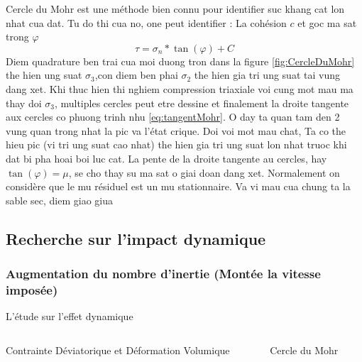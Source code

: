 \documentclass[a4paper,12pt]{report}
\begin{document}
Cercle du Mohr est une méthode bien connu pour identifier suc khang cat lon nhat cua dat. Tu do thi cua no, one peut identifier : La cohésion $c$ et goc ma sat trong $\varphi$
\begin{equation}
    \tau = \sigma_n * \tan(\varphi) + C
    \label{eq:tangentMohr}
\end{equation}
Diem quadrature ben trai cua moi duong tron dans la figure \ref{fig:CercleDuMohr} the hien ung suat $\sigma_3$,con diem ben phai $\sigma_2$ the hien gia tri ung suat tai vung dang xet.
Khi thuc hien thi nghiem compression triaxiale voi cung mot mau ma thay doi $\sigma_3$, multiples cercles peut etre dessine et finalement la droite tangente aux cercles co phuong trinh nhu \ref{eq:tangentMohr}.
O day ta quan tam den 2 vung quan trong nhat la pic va l'état crique.
Doi voi mot mau chat, Ta co the hieu pic (vi tri ung suat cao nhat) the hien gia tri ung suat lon nhat truoc khi dat bi pha hoai boi luc cat. 
La pente de la droite tangente au cercles, hay $\tan(\varphi) = \mu$, se cho thay su ma sat o giai doan dang xet. 
Normalement on considère que le mu résiduel est un mu stationnaire. 
Va vi mau cua chung ta la sable sec, diem giao giua 

\subsection{Recherche sur l'impact dynamique}

\subsubsection{Augmentation du nombre d'inertie (Montée la vitesse imposée)}


                                    \begin{frame}{L'étude sur l'effet dynamique}
    \begin{columns}
        \begin{column}{0.5\textwidth}
            \centering
            \scalebox{0.5}{}
            \vspace{0.5em}
            \centering
            {\small Contrainte Déviatorique et Déformation Volumique}
        \end{column}
            
        \begin{column}{0.5\textwidth}
            \centering
            \scalebox{0.5}{}
            \vspace{0.5em}
            {\small Cercle du Mohr}
        \end{column}
        \end{columns}
        \end{frame}
\end{document}
